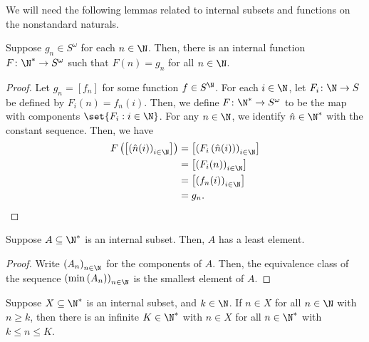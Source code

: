 \documentclass[10pt]{mypackage}
\begin{document}
We will need the following lemmas related to internal subsets and functions on the nonstandard naturals.
\begin{lemma}
  Suppose $g_n\in S^{\omega}$ for each $n\in \N$. Then, there is an internal function $F\colon \N^{\ast}\to S^{\omega}$ such that $F(n) = g_n$ for all $n\in \N$.
\end{lemma}
\begin{proof}
  Let $g_n = \left[ f_n \right]$ for some function $f\in S^{\N}$. For each $i\in \N$, let $F_i\colon \N\to S$ be defined by $F_i(n) = f_n(i)$. Then, we define $F\colon \N^{\ast}\to S^{\omega}$ to be the map with components $\set{F_i : i\in \N}$. For any $n\in \N$, we identify $\hat{n}\in \N^{\ast}$ with the constant sequence. Then, we have
  \begin{align*}
    F\left( \left[ \left( \hat{n}(i) \right)_{i\in \N} \right] \right) &= \left[ \left( F_i\left( \hat{n}(i) \right) \right)_{i\in \N} \right]\\
                                                                       &= \left[ \left( F_i(n) \right)_{i\in \N} \right]\\
                                                                       &= \left[ \left( f_n(i) \right)_{i\in \N} \right]\\
                                                                       &= g_n.
  \end{align*}
\end{proof}
\begin{lemma}
  Suppose $A\subseteq \N^{\ast}$ is an internal subset. Then, $A$ has a least element.
\end{lemma}
\begin{proof}
  Write $\left( A_n \right)_{n\in \N}$ for the components of $A$. Then, the equivalence class of the sequence $\left( \min\left( A_n \right) \right)_{n\in \N}$ is the smallest element of $A$.
\end{proof}
\begin{lemma}
  Suppose $X\subseteq \N^{\ast}$ is an internal subset, and $k\in \N$. If $n\in X$ for all $n\in \N$ with $n\geq k$, then there is an infinite $K\in \N^{\ast}$ with $n\in X$ for all $n\in \N^{\ast}$ with $k\leq n \leq K$.
\end{lemma}
\end{document}
